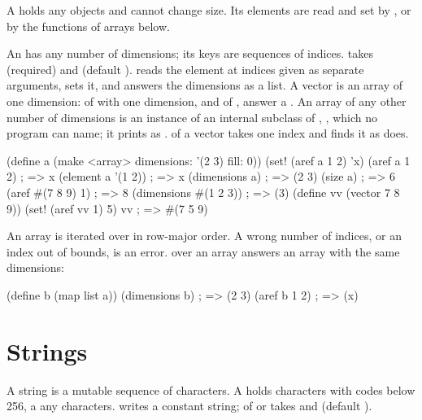 \noindent A  holds any objects and cannot
change size. Its elements are read and set by , or by the
functions of arrays below.

An  has any number of dimensions; its keys are sequences
of indices.  takes  (required) and
 (default ).  reads the element at
indices given as separate arguments,  sets it, and
 answers the dimensions as a list. A vector is an array
of one dimension:  of  with one dimension, and
 of , answer a . An
array of any other number of dimensions is an instance of an internal
subclass of , , which no program
can name; it prints as .  of a vector
takes one index and finds it as  does.

\begin{dylan}
(define a (make <array> dimensions: '(2 3) fill: 0))
(set! (aref a 1 2) 'x)
(aref a 1 2)            ; => x
(element a '(1 2))      ; => x
(dimensions a)          ; => (2 3)
(size a)                ; => 6
(aref #(7 8 9) 1)       ; => 8
(dimensions #(1 2 3))   ; => (3)
(define vv (vector 7 8 9))
(set! (aref vv 1) 5)
vv                      ; => #(7 5 9)
\end{dylan}

\noindent An array is iterated over in row-major order. A wrong number of
indices, or an index out of bounds, is an error.  over an
array answers an array with the same dimensions:

\begin{dylan}
(define b (map list a))
(dimensions b)          ; => (2 3)
(aref b 1 2)            ; => (x)
\end{dylan}

\section{Strings}\label{sec:collections-strings}

A string is a mutable sequence of characters. A 
holds characters with codes below 256, a  any
characters.  writes a constant string;  of
 or  takes  and
 (default ).

